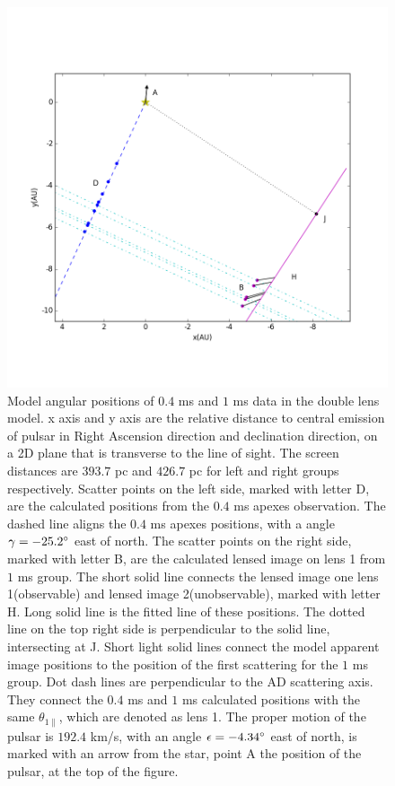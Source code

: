 \documentclass[useAMS,usenatbib]{mn2e}
\begin{document}
\begin{figure}
\centering
\includegraphics[width=1.0\textwidth, angle=0]{Double_lens_xy.png}
\caption{Model angular positions of $0.4$ ms and $1$ ms data in the double
  lens model. x axis and y axis are the relative distance to central
  emission of pulsar in Right Ascension direction and declination
  direction, on a 2D plane that is transverse to the line of
  sight. The screen distances are $393.7$ pc and $426.7$ pc for left and
  right groups
  respectively. Scatter points on the left side, marked with letter
  D, are the calculated positions from the $0.4$ ms apexes
  observation. The dashed line aligns the $0.4$ ms apexes
  positions, with a angle $\gamma=-25.2\degree$  east of north. The
  scatter points on the right side, marked with letter B, are the
  calculated lensed image on lens 1 from $1$ ms group. The short solid
  line connects the lensed image one lens 1(observable) and lensed
  image 2(unobservable), marked with letter H. Long solid line is the
  fitted line of these positions. The dotted line on the top right
  side is perpendicular to the solid line, intersecting at J. Short
  light solid lines connect the model apparent image positions to the
  position of the first scattering for the $1$ ms group. Dot dash
  lines are perpendicular to the 
  AD scattering axis.  They connect the $0.4$
  ms and $1$ ms calculated positions with the same
  $\theta_{1\parallel}$, which are denoted as lens 1. The proper
  motion of the pulsar is $192.4$ km/s, with an angle
  $\epsilon=-4.34\degree$ east of north, is marked with an arrow from
  the star, point A the position of the pulsar, at the top of the
  figure.} 
\label{Doublelens}
\end{figure}
\end{document}
